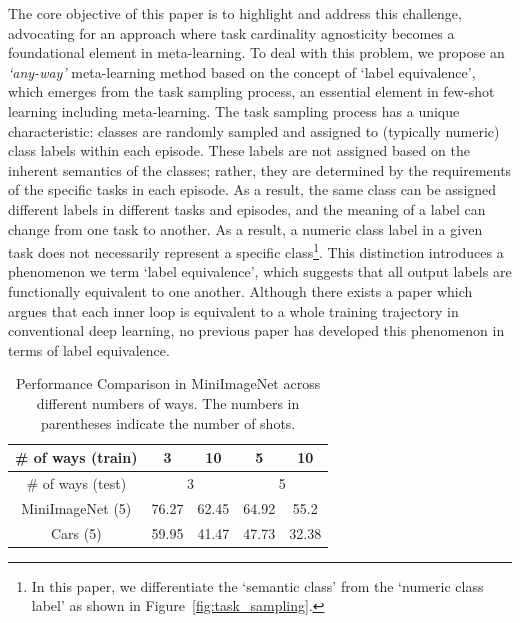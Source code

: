 \documentclass[letterpaper]{article} %
\begin{document}
The core objective of this paper is to highlight and address this challenge, advocating for an approach where task cardinality agnosticity becomes a foundational element in meta-learning.
To deal with this problem, we propose an \textit{‘any-way’} meta-learning method based on the concept of ‘label equivalence’, which emerges from the task sampling process, an essential element in few-shot learning including meta-learning.
The task sampling process has a unique characteristic: classes are randomly sampled and assigned to (typically numeric) class labels within each episode. These labels are not assigned based on the inherent semantics of the classes; rather, they are determined by the requirements of the specific tasks in each episode. As a result, the same class can be assigned different labels in different tasks and episodes, and the meaning of a label can change from one task to another. As a result, a numeric class label in a given task does not necessarily represent a specific class\footnote{In this paper, we differentiate the `semantic class' from the `numeric class label' as shown in Figure~\ref{fig:task_sampling}.}. This distinction introduces a phenomenon we term `label equivalence', which suggests that all output labels are functionally equivalent to one another. Although there exists a paper \cite{lee2023shot} which argues that each inner loop is equivalent to a whole training trajectory in conventional deep learning, no previous paper has developed this phenomenon in terms of label equivalence.

\begin{table}[t]
\centering
\begin{tabular}{c|cc|cc}
\hline
\# of ways (train)    & \multicolumn{1}{c|}{3} & 10    & \multicolumn{1}{c|}{5} & 10    \\ \hline
\# of ways (test)     & \multicolumn{2}{c|}{3} & \multicolumn{2}{c}{5} \\ \hline \hline
MiniImageNet (5) & 76.27      & 62.45     & 64.92     & 55.2      \\ \hline
Cars (5)        & 59.95      & 41.47     & 47.73     & 32.38    \\ \hline
\end{tabular}
\caption{Performance Comparison in MiniImageNet across different numbers of ways. The numbers in parentheses indicate the number of shots.}
\label{table:intuition}
\end{table}
\end{document}
